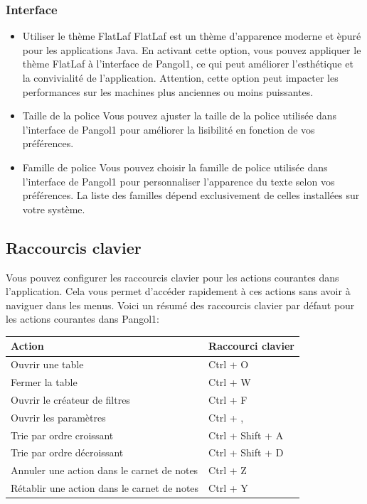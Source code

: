 \documentclass[11pt,a4paper]{article}
\begin{document}
\subsubsection*{Interface}
\begin{itemize}
  \item Utiliser le th\`eme FlatLaf
  \newline FlatLaf est un th\`eme d'apparence moderne et \`epur\'e pour les applications Java. En activant cette option, vous pouvez appliquer le th\`eme FlatLaf \`a l'interface de Pangol1, ce qui peut am\'eliorer l'esth\'etique et la convivialit\'e de l'application. Attention, cette option peut impacter les performances sur les machines plus anciennes ou moins puissantes.
  \item Taille de la police
  \newline Vous pouvez ajuster la taille de la police utilis\'ee dans l'interface de Pangol1 pour am\'eliorer la lisibilit\'e en fonction de vos pr\'ef\'erences.
  \item Famille de police
  \newline Vous pouvez choisir la famille de police utilis\'ee dans l'interface de Pangol1 pour personnaliser l'apparence du texte selon vos pr\'ef\'erences. La liste des familles d\'epend exclusivement de celles install\'ees sur votre syst\`eme.
\end{itemize}

\subsection{Raccourcis clavier}

Vous pouvez configurer les raccourcis clavier pour les actions courantes dans l'application. Cela vous permet d'acc\'eder rapidement \`a ces actions sans avoir \`a naviguer dans les menus. Voici un r\'esum\'e des raccourcis clavier par d\'efaut pour les actions courantes dans Pangol1:

\begin{center}
\begin{tabularx}{0.9\linewidth}{@{}lX@{}}
\toprule
Action & Raccourci clavier \\
\midrule
Ouvrir une table & Ctrl + O \\
Fermer la table & Ctrl + W \\
Ouvrir le cr\'eateur de filtres & Ctrl + F \\
Ouvrir les param\`etres & Ctrl + , \\
Trie par ordre croissant & Ctrl + Shift + A \\
Trie par ordre d\'ecroissant & Ctrl + Shift + D \\
Annuler une action dans le carnet de notes & Ctrl + Z \\
R\'etablir une action dans le carnet de notes & Ctrl + Y \\
\bottomrule
\end{tabularx}
\end{center}
\end{document}
